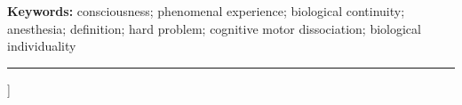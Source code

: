 \documentclass[9pt,twocolumn]{article}
\begin{document}
\begin{@twocolumnfalse}
\vspace{0.35em}
\noindent\textbf{Keywords:} consciousness; phenomenal experience; biological continuity; anesthesia; definition; hard problem; cognitive motor dissociation; biological individuality
\vspace{0.55em}
\hrule
\vspace{0.8em}
\end{@twocolumnfalse}
]





\end{document}
